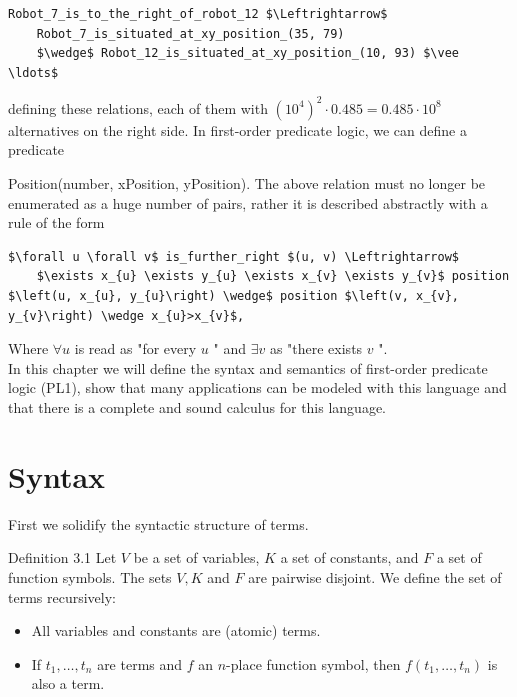 \documentclass[10pt]{book}
\begin{document}
\begin{verbatim}
Robot_7_is_to_the_right_of_robot_12 $\Leftrightarrow$
    Robot_7_is_situated_at_xy_position_(35, 79)
    $\wedge$ Robot_12_is_situated_at_xy_position_(10, 93) $\vee \ldots$
\end{verbatim}

defining these relations, each of them with $\left(10^{4}\right)^{2} \cdot 0.485=0.485 \cdot 10^{8}$ alternatives on the right side. In first-order predicate logic, we can define a predicate

Position(number, xPosition, yPosition). The above relation must no longer be enumerated as a huge number of pairs, rather it is described abstractly with a rule of the form

\begin{verbatim}
$\forall u \forall v$ is_further_right $(u, v) \Leftrightarrow$
    $\exists x_{u} \exists y_{u} \exists x_{v} \exists y_{v}$ position $\left(u, x_{u}, y_{u}\right) \wedge$ position $\left(v, x_{v}, y_{v}\right) \wedge x_{u}>x_{v}$,
\end{verbatim}

Where $\forall u$ is read as "for every $u$ " and $\exists v$ as "there exists $v$ ".\\
In this chapter we will define the syntax and semantics of first-order predicate logic (PL1), show that many applications can be modeled with this language and that there is a complete and sound calculus for this language.

\section{Syntax}
First we solidify the syntactic structure of terms.

Definition 3.1 Let $V$ be a set of variables, $K$ a set of constants, and $F$ a set of function symbols. The sets $V, K$ and $F$ are pairwise disjoint. We define the set of terms recursively:

\begin{itemize}
  \item All variables and constants are (atomic) terms.
  \item If $t_{1}, \ldots, t_{n}$ are terms and $f$ an $n$-place function symbol, then $f\left(t_{1}, \ldots, t_{n}\right)$ is also a term.
\end{itemize}
\end{document}

